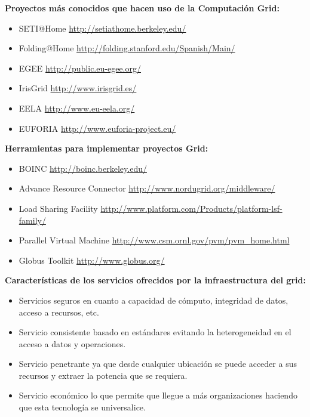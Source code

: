 \vspace{0,5cm}

\textbf{Proyectos más conocidos que hacen uso de la Computación Grid:}

\begin{itemize}
  
\item SETI@Home \url{http://setiathome.berkeley.edu/}
\item Folding@Home \url{http://folding.stanford.edu/Spanish/Main/}
\item EGEE \url{http://public.eu-egee.org/}
\item IrisGrid \url{http://www.irisgrid.es/}
\item EELA \url{ http://www.eu-eela.org/}
\item EUFORIA \url{http://www.euforia-project.eu/}

\end{itemize}

\vspace{0,5cm}

\textbf{ Herramientas para implementar proyectos Grid:}

\begin{itemize}
 \item  BOINC \url{http://boinc.berkeley.edu/}
 \item  Advance Resource Connector \url{http://www.nordugrid.org/middleware/}
 \item  Load Sharing Facility \url{http://www.platform.com/Products/platform-lsf-family/}
 \item  Parallel Virtual Machine \url{http://www.csm.ornl.gov/pvm/pvm_home.html}
 \item  Globus Toolkit \url{http://www.globus.org/}
\end{itemize}

\textbf{Características de los servicios ofrecidos por la infraestructura del grid:}

\begin{itemize}
\item Servicios seguros en cuanto a capacidad de cómputo, integridad de datos, acceso a recursos, etc.
\item Servicio consistente basado en estándares evitando la heterogeneidad en el acceso a datos y operaciones.
\item Servicio penetrante ya que desde cualquier ubicación se puede acceder a sus recursos y extraer la potencia que se requiera.
\item Servicio económico lo que permite que llegue a más organizaciones haciendo que esta tecnología se universalice.
\end{itemize}


